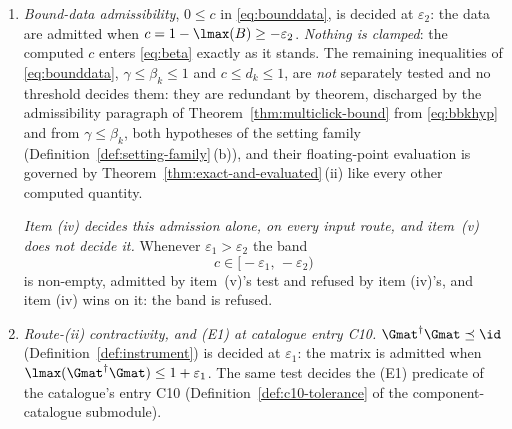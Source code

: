 \begin{definition}
\begin{enumerate}[label=(\roman*),leftmargin=3.0em]
  in the detector-imperfections submodule, Definition~\ref{def:darktol}, which
  extends this list; the tolerances that definition spends are the
  $\varepsilon_4$ and $\varepsilon_2$ of this list.
\item \emph{Bound-data admissibility}, $0\le c$ in \eqref{eq:bounddata}, is
  decided at $\varepsilon_2$: the data are admitted when
  $c=1-\lmax(B)\ge-\varepsilon_2$. \emph{Nothing is clamped}: the computed
  $c$ enters \eqref{eq:beta} exactly as it stands. The remaining inequalities of
  \eqref{eq:bounddata}, $\gamma\le\beta_k\le1$ and $c\le d_k\le1$, are
  \emph{not} separately tested and no threshold decides them: they are
  redundant by theorem, discharged by the admissibility paragraph of
  Theorem~\ref{thm:multiclick-bound} from \eqref{eq:bbkhyp} and from
  $\gamma\le\beta_k$, both hypotheses of the setting family
  (Definition~\ref{def:setting-family}\,(b)), and their floating-point
  evaluation is governed by Theorem~\ref{thm:exact-and-evaluated}\,(ii) like every other
  computed quantity.

  \emph{Item (iv) decides this admission alone, on every input route, and
  item~(v) does not decide it.} Whenever $\varepsilon_1>\varepsilon_2$ the band
  \begin{equation}\label{eq:tolmapband}
    c\in\big[-\varepsilon_1,\,-\varepsilon_2\big)
  \end{equation}
  is non-empty, admitted by item~(v)'s test and refused by item (iv)'s, and
  item (iv) wins on it: the band is refused.
\item \emph{Route-(ii) contractivity, and (E1) at catalogue entry C10.}
  $\Gmat^\dagger\Gmat\preceq\id$ (Definition~\ref{def:instrument}) is decided
  at $\varepsilon_1$: the matrix is admitted when
  $\lmax(\Gmat^\dagger\Gmat)\le1+\varepsilon_1$. The same test decides the (E1)
  predicate of the catalogue's  entry C10
  (Definition~\ref{def:c10-tolerance} of the component-catalogue submodule).


\end{enumerate}
\end{definition}
